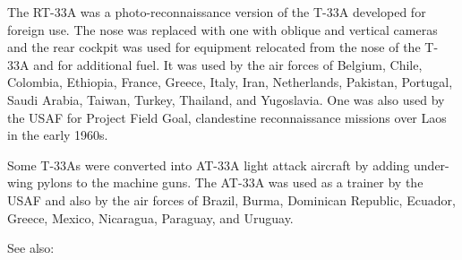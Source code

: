 The RT-33A was a photo-reconnaissance version of the T-33A developed for foreign use. The nose was replaced with one with oblique and vertical cameras and the rear cockpit was used for equipment relocated from the nose of the T-33A and for additional fuel. It was used by the air forces of Belgium, Chile, Colombia, Ethiopia, France, Greece, Italy, Iran, Netherlands, Pakistan, Portugal, Saudi Arabia, Taiwan, Turkey, Thailand, and Yugoslavia. One was also used by the USAF for Project Field Goal, clandestine reconnaissance missions over Laos in the early 1960s.

Some T-33As were converted into AT-33A light attack aircraft by adding under-wing pylons to the machine guns. The AT-33A was used as a trainer by the USAF and also by the air forces of Brazil, Burma, Dominican Republic, Ecuador, Greece, Mexico, Nicaragua, Paraguay, and Uruguay.

\begin{adclist}
\end{adclist}

See also:
\begin{typelist}
\end{typelist}